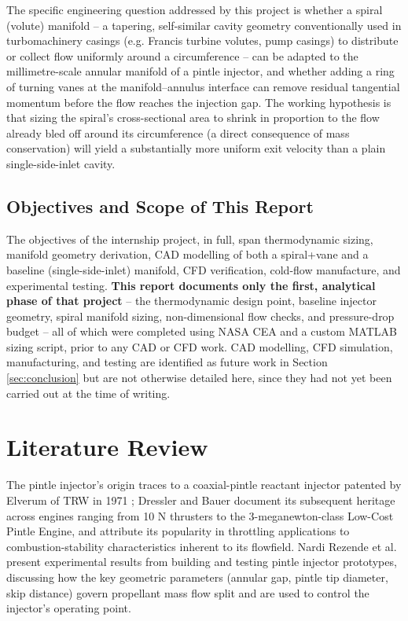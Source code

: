 \documentclass[11pt,a4paper]{article}
\begin{document}
The specific engineering question addressed by this project is whether a spiral (volute) manifold -- a tapering, self-similar cavity geometry conventionally used in turbomachinery casings (e.g. Francis turbine volutes, pump casings) to distribute or collect flow uniformly around a circumference -- can be adapted to the millimetre-scale annular manifold of a pintle injector, and whether adding a ring of turning vanes at the manifold--annulus interface can remove residual tangential momentum before the flow reaches the injection gap. The working hypothesis is that sizing the spiral's cross-sectional area to shrink in proportion to the flow already bled off around its circumference (a direct consequence of mass conservation) will yield a substantially more uniform exit velocity than a plain single-side-inlet cavity.

\subsection{Objectives and Scope of This Report}

The objectives of the internship project, in full, span thermodynamic sizing, manifold geometry derivation, CAD modelling of both a spiral+vane and a baseline (single-side-inlet) manifold, CFD verification, cold-flow manufacture, and experimental testing. \textbf{This report documents only the first, analytical phase of that project} -- the thermodynamic design point, baseline injector geometry, spiral manifold sizing, non-dimensional flow checks, and pressure-drop budget -- all of which were completed using NASA CEA and a custom MATLAB sizing script, prior to any CAD or CFD work. CAD modelling, CFD simulation, manufacturing, and testing are identified as future work in Section \ref{sec:conclusion} but are not otherwise detailed here, since they had not yet been carried out at the time of writing.

\section{Literature Review}

The pintle injector's origin traces to a coaxial-pintle reactant injector patented by Elverum of TRW in 1971 \cite{elverum1971}; Dressler and Bauer \cite{dressler2000} document its subsequent heritage across engines ranging from 10 N thrusters to the 3-meganewton-class Low-Cost Pintle Engine, and attribute its popularity in throttling applications to combustion-stability characteristics inherent to its flowfield. Nardi Rezende et al. \cite{nardi_rezende} present experimental results from building and testing pintle injector prototypes, discussing how the key geometric parameters (annular gap, pintle tip diameter, skip distance) govern propellant mass flow split and are used to control the injector's operating point.
\end{document}
